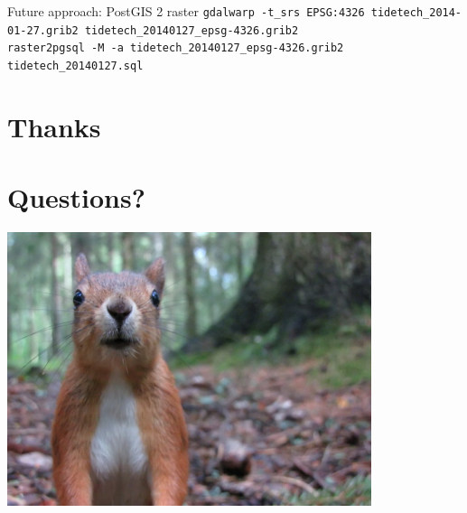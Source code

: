 \documentclass[xcolor=svgnames]{beamer}
\begin{document}
    \begin{frame}{Future approach: PostGIS 2 raster}
        \tiny{
            \texttt{gdalwarp -t\_srs EPSG:4326 tidetech\_2014-01-27.grib2 tidetech\_20140127\_epsg-4326.grib2}\\
            \texttt{raster2pgsql -M -a tidetech\_20140127\_epsg-4326.grib2 tidetech\_20140127.sql}
    }
    \end{frame}

\section{Thanks}

    \begin{frame}
    \end{frame}

\section{Questions?}

    \begin{frame}
        \begin{center}
            \includegraphics[width=0.8\textwidth]{img/questions}
        \end{center}
    \end{frame}
\end{document}
